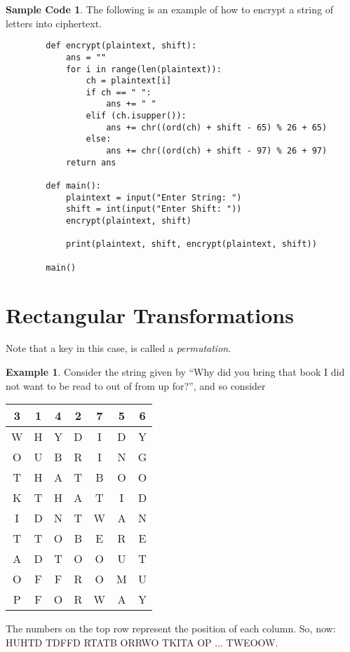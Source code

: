 \documentclass[11pt]{amsart}
\theoremstyle{definition}\newtheorem{definition}{Definition}
\theoremstyle{definition}\newtheorem{example}{Example}
\theoremstyle{definition}\newtheorem{samplecode}{Sample Code}
\begin{document}
\begin{samplecode}
    The following is an example of how to encrypt a string of letters into ciphertext.
    \begin{verbatim}
        def encrypt(plaintext, shift):
            ans = ""
            for i in range(len(plaintext)):
                ch = plaintext[i]
                if ch == " ":
                    ans += " "
                elif (ch.isupper()):
                    ans += chr((ord(ch) + shift - 65) % 26 + 65)
                else:
                    ans += chr((ord(ch) + shift - 97) % 26 + 97)
            return ans

        def main():
            plaintext = input("Enter String: ")
            shift = int(input("Enter Shift: "))
            encrypt(plaintext, shift)
            
            print(plaintext, shift, encrypt(plaintext, shift))
            
        main()
    \end{verbatim}
\end{samplecode}

\section{Rectangular Transformations}

Note that a key in this case, is called a \emph{permutation}.

\begin{example}
    Consider the string given by ``Why did you bring that book I did not want to be read to out of from up for?'', and so consider
    \begin{center}
        \begin{tabular}{ccccccc}
            3 & 1 & 4 & 2 & 7 & 5 & 6 \\ \hline
            W & H & Y & D & I & D & Y \\
            O & U & B & R & I & N & G \\
            T & H & A & T & B & O & O \\
            K & T & H & A & T & I & D \\
            I & D & N & T & W & A & N \\
            T & T & O & B & E & R & E \\
            A & D & T & O & O & U & T \\
            O & F & F & R & O & M & U \\
            P & F & O & R & W & A & Y
        \end{tabular}
    \end{center}
    The numbers on the top row represent the position of each column. So, now: HUHTD TDFFD RTATB ORRWO TKITA OP ... TWEOOW.
\end{example}
\end{document}
